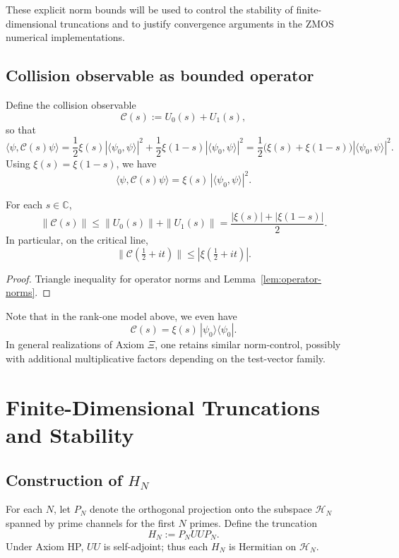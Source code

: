 \documentclass[11pt]{article}
\begin{document}
These explicit norm bounds will be used to control the stability of finite-dimensional truncations and to justify convergence arguments in the ZMOS numerical implementations.

\subsection{Collision observable as bounded operator}

Define the collision observable
\begin{equation}
  \mathcal{C}(s) := U_0(s) + U_1(s),
\end{equation}
so that
\[
  \langle\psi, \mathcal{C}(s)\psi\rangle
  = \frac12\xi(s)|\langle\psi_0,\psi\rangle|^2
    + \frac12\xi(1-s)|\langle\psi_0,\psi\rangle|^2
  = \frac12\bigl(\xi(s)+\xi(1-s)\bigr)|\langle\psi_0,\psi\rangle|^2.
\]
Using $\xi(s)=\xi(1-s)$, we have
\[
  \langle\psi, \mathcal{C}(s)\psi\rangle
  = \xi(s)\,|\langle\psi_0,\psi\rangle|^2.
\]

\begin{lemma}\label{lem:C-norm}
For each $s\in\mathbb{C}$,
\[
  \|\mathcal{C}(s)\| \le \|U_0(s)\| + \|U_1(s)\|
  = \frac{|\xi(s)|+|\xi(1-s)|}{2}.
\]
In particular, on the critical line,
\[
  \|\mathcal{C}(\tfrac12+it)\| \le |\xi(\tfrac12+it)|.
\]
\end{lemma}

\begin{proof}
Triangle inequality for operator norms and Lemma~\ref{lem:operator-norms}.
\end{proof}

Note that in the rank-one model above, we even have
\[
  \mathcal{C}(s) = \xi(s)\,|\psi_0\rangle \langle\psi_0|.
\]
In general realizations of Axiom $\Xi$, one retains similar norm-control, possibly with additional multiplicative factors depending on the test-vector family.

\section{Finite-Dimensional Truncations and Stability}

\subsection{Construction of $H_N$}

For each $N$, let $P_N$ denote the orthogonal projection onto the subspace $\mathcal{H}_N$ spanned by prime channels for the first $N$ primes.  Define the truncation
\[
  H_N := P_N UU P_N.
\]
Under Axiom HP, $UU$ is self-adjoint; thus each $H_N$ is Hermitian on $\mathcal{H}_N$.
\end{document}
